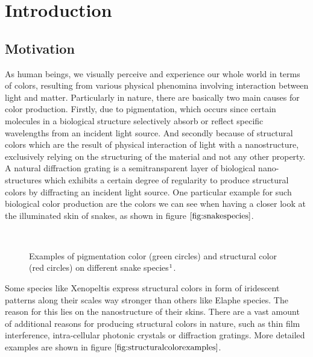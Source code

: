\chapter{Introduction}
\section{Motivation}
As human beings, we visually perceive and experience our whole world in terms of colors, resulting from various physical phenomina involving interaction between light and matter. Particularly in nature, there are basically two main causes for color production. Firstly, due to pigmentation, which occurs since certain molecules in a biological structure selectively absorb or reflect specific wavelengths from an incident light source. And secondly because of structural colors which are the result of physical interaction of light with a nanostructure, exclusively relying on the structuring of the material and not any other property. A natural diffraction grating is a semitransparent layer of biological nano-structures which exhibits a certain degree of regularity to produce structural colors by diffracting an incident light source. One particular example for such biological color production are the colors we can see when having a closer look at the illuminated skin of snakes, as shown in figure $\ref{fig:snakespecies}$.

\begin{figure}[H]
  \centering
~
  \caption[Example of Biological Color Production]{Examples of pigmentation color (green circles) and structural color (red circles) on different snake species$\footnotemark$.}
  \label{fig:snakespecies}
\end{figure}

Some species like Xenopeltis express structural colors in form of iridescent patterns along their scales way stronger than others like Elaphe species. The reason for this lies on the nanostructure of their skins. There are a vast amount of additional reasons for producing structural colors in nature, such as thin film interference, intra-cellular photonic crystals or diffraction gratings. More detailed examples are shown in figure $\ref{fig:structuralcolorexamples}$. 

